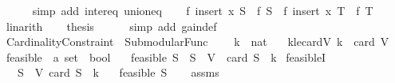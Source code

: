 \begin{isabellebody}
\ \ \ \ \isamarkupfalse%
\ {\isacharparenleft}{\kern0pt}simp\ add{\isacharcolon}{\kern0pt}\ inter{\isacharunderscore}{\kern0pt}eq\ union{\isacharunderscore}{\kern0pt}eq{\isacharparenright}{\kern0pt}\isanewline
\isanewline
\ \ \isamarkupfalse%
\ {\isachardoublequoteopen}f\ {\isacharparenleft}{\kern0pt}insert\ x\ S{\isacharparenright}{\kern0pt}\ {\isacharminus}{\kern0pt}\ f\ S\ {\isasymge}\ f\ {\isacharparenleft}{\kern0pt}insert\ x\ T{\isacharparenright}{\kern0pt}\ {\isacharminus}{\kern0pt}\ f\ T{\isachardoublequoteclose}\isanewline
\ \ \ \ \isamarkupfalse%
\ linarith\isanewline
\isanewline
\ \ \isamarkupfalse%
\ {\isacharquery}{\kern0pt}thesis\isanewline
\ \ \ \ \isamarkupfalse%
\ {\isacharparenleft}{\kern0pt}simp\ add{\isacharcolon}{\kern0pt}\ gain{\isacharunderscore}{\kern0pt}def{\isacharparenright}{\kern0pt}\isanewline
{}\isamarkupfalse%
%
\endisatagproof
{\isafoldproof}%
%
\isadelimproof
\isanewline
%
\endisadelimproof
\isanewline
{}\isamarkupfalse%
\isanewline
\isanewline
{}\isamarkupfalse%
\ Cardinality{\isacharunderscore}{\kern0pt}Constraint\ {\isacharequal}{\kern0pt}\ Submodular{\isacharunderscore}{\kern0pt}Func\ {\isacharplus}{\kern0pt}\isanewline
\ \ \ k\ {\isacharcolon}{\kern0pt}{\isacharcolon}{\kern0pt}\ nat\isanewline
\ \ \ k{\isacharunderscore}{\kern0pt}le{\isacharunderscore}{\kern0pt}cardV{\isacharcolon}{\kern0pt}\ {\isachardoublequoteopen}k\ {\isasymle}\ card\ V{\isachardoublequoteclose}\isanewline
{}\isanewline
\isanewline
{}\isamarkupfalse%
\ feasible\ {\isacharcolon}{\kern0pt}{\isacharcolon}{\kern0pt}\ {\isachardoublequoteopen}{\isacharprime}{\kern0pt}a\ set\ {\isasymRightarrow}\ bool{\isachardoublequoteclose}\ \isanewline
\ \ {\isachardoublequoteopen}feasible\ S\ {\isasymlongleftrightarrow}\ S\ {\isasymsubseteq}\ V\ {\isasymand}\ card\ S\ {\isasymle}\ k{\isachardoublequoteclose}\isanewline
\isanewline
{}\isamarkupfalse%
\ feasibleI{\isacharcolon}{\kern0pt}\isanewline
\ \ \ {\isachardoublequoteopen}S\ {\isasymsubseteq}\ V{\isachardoublequoteclose}\ {\isachardoublequoteopen}card\ S\ {\isasymle}\ k{\isachardoublequoteclose}\isanewline
\ \ \ {\isachardoublequoteopen}feasible\ S{\isachardoublequoteclose}\isanewline
%
\isadelimproof
\ \ %
\endisadelimproof
%
\isatagproof
{}\isamarkupfalse%
\ assms\ \isamarkupfalse%

\end{isabellebody}
